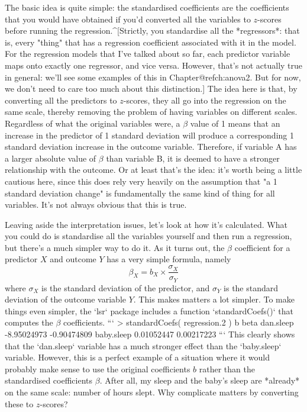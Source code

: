 The basic idea is quite simple: the standardised coefficients are the coefficients that you would have obtained if you'd converted all the variables to $z$-scores before running the regression.^[Strictly, you standardise all the *regressors*: that is, every "thing" that has a regression coefficient associated with it in the model. For the regression models that I've talked about so far, each predictor variable maps onto exactly one regressor, and vice versa. However, that's not actually true in general: we'll see some examples of this in Chapter@refch:anova2. But for now, we don't need to care too much about this distinction.]  The idea here is that, by converting all the predictors to $z$-scores, they all go into the regression on the same scale, thereby removing the problem of having variables on different scales. Regardless of what the original variables were, a $\beta$ value of 1 means that an increase in the predictor of 1 standard deviation will produce a corresponding 1 standard deviation increase in the outcome variable. Therefore, if variable A has a larger absolute value of $\beta$ than variable B, it is deemed to have a stronger relationship with the outcome. Or at least that's the idea: it's worth being a little cautious here, since this does rely very heavily on the assumption that "a 1 standard deviation change" is fundamentally the same kind of thing for all variables. It's not always obvious that this is true.  


Leaving aside the interpretation issues, let's look at how it's calculated. What you could do is standardise all the variables yourself and then run a regression, but there's a much simpler way to do it. As it turns out, the $\beta$ coefficient for a predictor $X$ and outcome $Y$ has a very simple formula, namely
$$
\beta_X = b_X \times \frac{\sigma_X}{\sigma_Y} 
$$
where $\sigma_X$ is the standard deviation of the predictor, and $\sigma_Y$ is the standard deviation of the outcome variable $Y$. This makes matters a lot simpler. To make things even simpler, the `lsr` package includes a function `standardCoefs()` that computes the $\beta$ coefficients. 
```
> standardCoefs( regression.2 )
                     b        beta
dan.sleep  -8.95024973 -0.90474809
baby.sleep  0.01052447  0.00217223
```
This clearly shows that the `dan.sleep` variable has a much stronger effect than the `baby.sleep` variable. However, this is a perfect example of a situation where it would probably make sense to use the original coefficients $b$ rather than the standardised coefficients $\beta$. After all, my sleep and the baby's sleep are *already* on the same scale: number of hours slept. Why complicate matters by converting these to $z$-scores?





